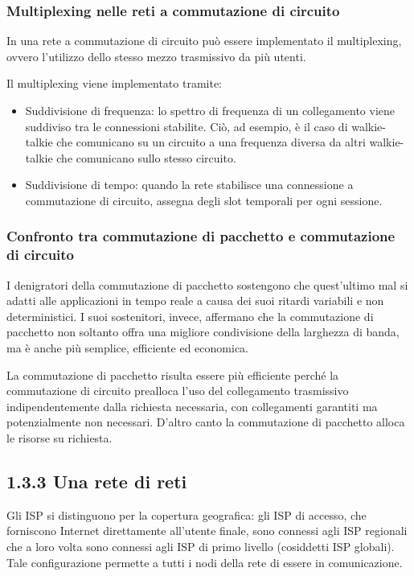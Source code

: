 \documentclass{book}
\begin{document}
\subsubsection{Multiplexing nelle reti a commutazione di circuito}
In una rete a commutazione di circuito può essere implementato il multiplexing, ovvero l'utilizzo dello stesso mezzo trasmissivo da più utenti.
	
Il multiplexing viene implementato tramite:
	
\begin{itemize}
	\item Suddivisione di frequenza: lo spettro di frequenza di un collegamento viene suddiviso tra le connessioni stabilite. Ciò, ad esempio, è il caso di walkie-talkie che comunicano su un circuito a una frequenza diversa da altri walkie-talkie che comunicano sullo stesso circuito.
	\item Suddivisione di tempo: quando la rete stabilisce una connessione a commutazione di circuito, assegna degli slot temporali per ogni sessione.
\end{itemize}

\subsubsection{Confronto tra commutazione di pacchetto e commutazione di circuito}
I denigratori della commutazione di pacchetto sostengono che quest'ultimo mal si adatti alle applicazioni in tempo reale a causa dei suoi ritardi variabili e non deterministici. I suoi sostenitori, invece, affermano che la commutazione di pacchetto non soltanto offra una migliore condivisione della larghezza di banda, ma è anche più semplice, efficiente ed economica.
	
La commutazione di pacchetto risulta essere più efficiente perché la commutazione di circuito prealloca l'uso del collegamento trasmissivo indipendentemente dalla richiesta necessaria, con collegamenti garantiti ma potenzialmente non necessari. D'altro canto la commutazione di pacchetto alloca le risorse su richiesta.
	
\subsection*{1.3.3 Una rete di reti}
Gli ISP si distinguono per la copertura geografica: gli ISP di accesso, che forniscono Internet direttamente all'utente finale, sono connessi agli ISP regionali che a loro volta sono connessi agli ISP di primo livello (cosiddetti ISP globali). Tale configurazione permette a tutti i nodi della rete di essere in comunicazione.
	
\end{document}
